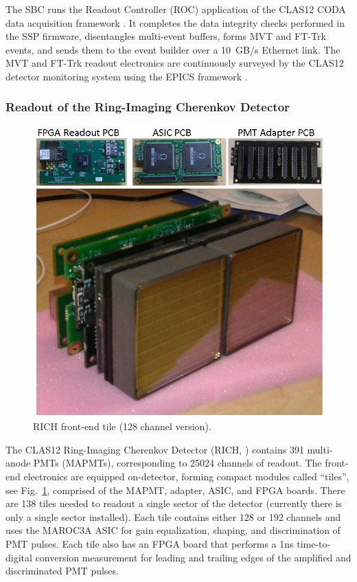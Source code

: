 The SBC runs the Readout Controller (ROC) application of the CLAS12 CODA data acquisition framework \cite{coda-ref}. It completes the data integrity checks performed in the SSP firmware, disentangles multi-event buffers, forms MVT and FT-Trk events, and sends them to the event builder over a 10~GB/s Ethernet link. The MVT and FT-Trk readout electronics are continuously surveyed by the CLAS12 detector monitoring system using the EPICS framework \cite{epics-website}.

\subsubsection{Readout of the Ring-Imaging Cherenkov Detector}

\begin{figure}[hbt]
	\centering
	\includegraphics[width=1.0\columnwidth,keepaspectratio]{img/rich_tile_128ch.png}
	\caption{RICH front-end tile (128 channel version).}
	\label{fig:rich1}
\end{figure}

The CLAS12 Ring-Imaging Cherenkov Detector (RICH, \cite{rich-ref}) contains 391 multi-anode PMTs (MAPMTs), corresponding to 25024 channels of readout. The front-end electronics are equipped on-detector, forming compact modules called ``tiles'', see Fig.~\ref{fig:rich1}, comprised of the MAPMT, adapter, ASIC, and FPGA boards. There are 138 tiles needed to readout a single sector of the detector (currently there is only a single sector installed). Each tile contains either 128 or 192 channels and uses the MAROC3A ASIC for gain equalization, shaping, and discrimination of PMT pulses. Each tile also has an FPGA board that performs a 1ns time-to-digital conversion measurement for leading and trailing edges of the amplified and discriminated PMT pulses.

